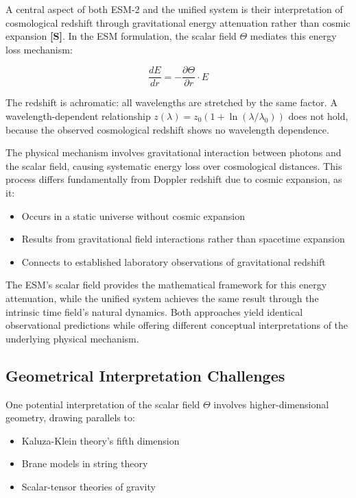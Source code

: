 	A central aspect of both ESM-2 and the unified system is their interpretation of cosmological redshift through gravitational energy attenuation rather than cosmic expansion \textbf{[S]}. In the ESM formulation, the scalar field $\Theta$ mediates this energy loss mechanism:
	
	\begin{equation}
		\frac{dE}{dr} = -\frac{\partial \Theta}{\partial r} \cdot E
	\end{equation}
	
	The redshift is achromatic: all wavelengths are stretched by the same factor. A wavelength-dependent relationship $z(\lambda) = z_0(1 + \ln(\lambda/\lambda_0))$ does not hold, because the observed cosmological redshift shows no wavelength dependence.
	
	The physical mechanism involves gravitational interaction between photons and the scalar field, causing systematic energy loss over cosmological distances. This process differs fundamentally from Doppler redshift due to cosmic expansion, as it:
	
	\begin{itemize}
		\item Occurs in a static universe without cosmic expansion
		\item Results from gravitational field interactions rather than spacetime expansion
		\item Connects to established laboratory observations of gravitational redshift \cite{Pound1960,Bertotti2003}
	\end{itemize}
	
	The ESM's scalar field provides the mathematical framework for this energy attenuation, while the unified system achieves the same result through the intrinsic time field's natural dynamics. Both approaches yield identical observational predictions while offering different conceptual interpretations of the underlying physical mechanism.
	
	\subsection{Geometrical Interpretation Challenges}
	\label{subsec:geometrical_challenges}
	
	One potential interpretation of the scalar field $\Theta$ involves higher-dimensional geometry, drawing parallels to:
	
	\begin{itemize}
		\item Kaluza-Klein theory's fifth dimension \cite{Kaluza1921,Klein1926}
		\item Brane models in string theory \cite{Randall1999}
		\item Scalar-tensor theories of gravity \cite{Brans1961}
	\end{itemize}
	
